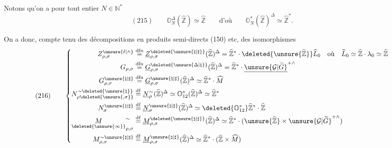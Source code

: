 Notons qu'on a pour tout entier $N\in\mathbb N^{*}$
\[
(215)\qquad
\mathbb O_{N}^{\Delta}
(\widehat{\mathbb Z})\simeq\widehat{\mathbb Z}
\qquad\text{d'où}\qquad
\mathbb O_{N}^{*}(\widehat{\mathbb Z})^{\Delta}
\simeq\widehat{\mathbb Z}^{*}.
\]

On a donc, compte tenu des décompositions en produits semi-directs (150) etc,
des isomorphismes
\[
(216)\qquad
\left\{\begin{aligned}
Z_{\rho,\sigma}^{\unsure{\ell|\wedge}}
&\overset{\mathrm{dfn}}{=}
\underline Z_{\rho,\sigma}^{\deleted{\unsure{\natural|\sharp}}}
(\widehat{\mathbb Z})^{\Delta}
=\widehat{\mathbb Z}^{*}\cdot
\deleted{\unsure{\widehat{\mathbb Z}}}\widehat L_0
\quad\text{où}\quad
\widehat L_0\simeq\widehat{\mathbb Z}\cdot\lambda_0\simeq\widehat{\mathbb Z}
\\
G_{\rho,\sigma}
&\overset{\mathrm{dfn}}{=}
\underline G_{\rho,\sigma}^{\deleted{\unsure{\Delta|\natural}}}
(\widehat{\mathbb Z})^{\Delta}
=\widehat{\mathbb Z}^{*}\cdot
\underline{\unsure{\mathcal G|\widetilde G}}^{+\wedge}
\\
G_{\rho,\sigma}^{\unsure{\natural|\sharp}}
&\overset{\mathrm{dfn}}{=}
\underline G_{\rho,\sigma}^{\unsure{\natural|\sharp}}
(\widehat{\mathbb Z})^{\Delta}
\simeq\widehat{\mathbb Z}^{*}\cdot\widehat M
\\
N_{\rho\deleted{\unsure{,\sigma}}}^{\sim\deleted{\unsure{\natural}}}
&\overset{\mathrm{df}}{=}
\underline N_\rho^{\sim}(\widehat{\mathbb Z})^{\Delta}
\simeq\mathbb O_{12}^{*}
(\widehat{\mathbb Z})^{\Delta}\simeq\widehat{\mathbb Z}^{*}
\\
N_\sigma^{\unsure{\natural|\sharp}}
&\overset{\mathrm{df}}{=}
\underline N_\sigma^{\unsure{\natural|\sharp}}
(\widehat{\mathbb Z})^{\Delta}
\simeq\deleted{\mathbb O_{12}^{*}}
\widehat{\mathbb Z}^{*}\cdot\widehat{\mathbb Z}
\\
\underset{\deleted{\unsure{\infty}}}{M}_{\rho,\sigma}^{\sim}
&\overset{\mathrm{df}}{=}
\underline M_{\rho,\sigma}^{\deleted{\unsure{\natural|\sharp}}}
(\widehat{\mathbb Z})^{\Delta}
\simeq\widehat{\mathbb Z}^{*}\cdot
(\unsure{\widehat{\mathbb Z}}\times
\unsure{\mathcal G|\widetilde G}^{+\wedge})
\\
M_{\rho,\sigma}^{\sim\unsure{\natural|\sharp}}
&\overset{\mathrm{df}}{=}
\underline M_{\rho,\sigma}^{\unsure{\natural|\sharp}}
(\widehat{\mathbb Z})^{\Delta}
\simeq\widehat{\mathbb Z}^{*}\cdot
(\widehat{\mathbb Z}\times\widehat M)
\end{aligned}\right.
\]
